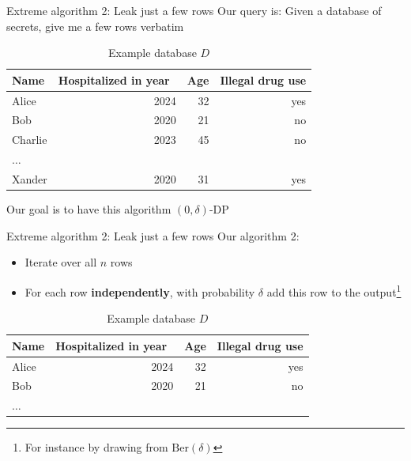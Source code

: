 \documentclass[12pt,aspectratio=169,handout]{beamer}
\begin{document}
\begin{frame}{Extreme algorithm 2: Leak just a few rows}
Our query is: Given a database of secrets, give me a few rows verbatim

\begin{table}
\footnotesize
\begin{tabular}{lrrr} \toprule
Name & Hospitalized in year & Age & Illegal drug use \\ \midrule
Alice & 2024 & 32 & yes \\
Bob & 2020 & 21 & no \\
Charlie & 2023 & 45 & no \\
$\ldots$ & & & \\
Xander & 2020 & 31 & yes \\ \bottomrule
\end{tabular}
\caption{Example database $D$}
\end{table}

Our goal is to have this algorithm $(0, \delta)$-DP

\end{frame}

\begin{frame}{Extreme algorithm 2: Leak just a few rows}
Our algorithm 2:
\begin{itemize}
\item Iterate over all $n$ rows
\item For each row \textbf{independently}, with probability $\delta$ add this row to the output\footnote{For instance by drawing from $\mathrm{Ber}(\delta)$}
\end{itemize}
\begin{table}
\footnotesize
\begin{tabular}{lrrr} \toprule
Name & Hospitalized in year & Age & Illegal drug use \\ \midrule
Alice & 2024 & 32 & yes \\
Bob & 2020 & 21 & no \\
$\ldots$ & & & \\ \bottomrule
\end{tabular}
\caption{Example database $D$}
\end{table}

\end{frame}
\end{document}
